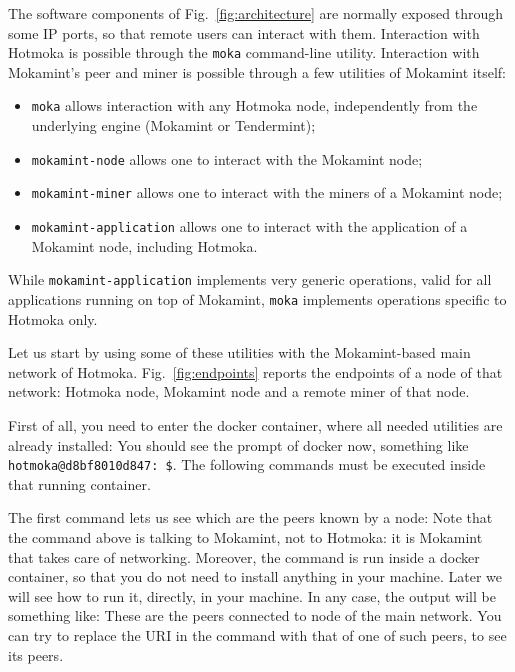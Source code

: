 The software components of Fig.~\ref{fig:architecture} are normally exposed through some IP ports, so that
remote users can interact with them. Interaction with Hotmoka is possible through the \texttt{moka} command-line utility.
Interaction with Mokamint's peer and miner is possible through a few utilities of Mokamint itself:
%
\begin{itemize}
\item \texttt{moka} allows interaction with any Hotmoka node, independently from the underlying engine (Mokamint or Tendermint);
\item \texttt{mokamint-node} allows one to interact with the Mokamint node;
\item \texttt{mokamint-miner} allows one to interact with the miners of a Mokamint node;
\item \texttt{mokamint-application} allows one to interact with the application of a Mokamint node, including Hotmoka.
\end{itemize}
%
While \texttt{mokamint-application} implements very generic operations, valid for all applications running on top of
Mokamint, \texttt{moka} implements operations specific to Hotmoka only.

Let us start by using some of these utilities with the Mokamint-based main network \texttt{\serverMokamintMainChainId{}}
of Hotmoka. Fig.~\ref{fig:endpoints} reports the endpoints of a node of that network: Hotmoka node, Mokamint node and a remote miner
of that node.

First of all, you need to enter the docker container, where all needed utilities are already installed:
%
%
You should see the prompt of docker now, something like \texttt{hotmoka@d8bf8010d847:~\$}.
The following commands must be executed inside that running container.

The first command lets us see which are the peers known by a node:
%
%
Note that the command above is talking to Mokamint, not to Hotmoka: it is Mokamint
that takes care of networking. Moreover, the command is run inside a docker container, so
that you do not need to install anything in your machine. Later we will see how to
run it, directly, in your machine. In any case, the output will be something like:
%
%
These are the peers connected to node \serverMokamintMainPublic{} of the main network.
You can try to replace the URI in the command with that of one of such peers,
to see its peers.

